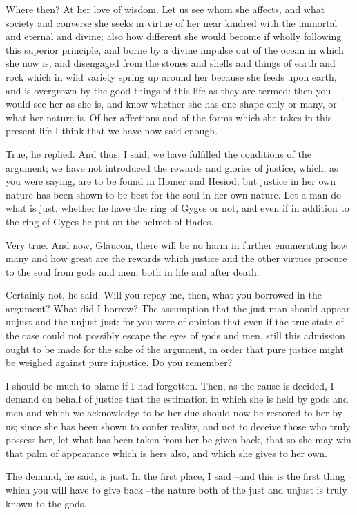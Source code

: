 Where then?
At her love of wisdom. Let us see whom she affects, and what society and converse she seeks in virtue of her near kindred with the immortal and eternal and divine; also how different she would become if wholly following this superior principle, and borne by a divine impulse out of the ocean in which she now is, and disengaged from the stones and shells and things of earth and rock which in wild variety spring up around her because she feeds upon earth, and is overgrown by the good things of this life as they are termed: then you would see her as she is, and know whether she has one shape only or many, or what her nature is. Of her affections and of the forms which she takes in this present life I think that we have now said enough.

True, he replied.
And thus, I said, we have fulfilled the conditions of the argument; we have not introduced the rewards and glories of justice, which, as you were saying, are to be found in Homer and Hesiod; but justice in her own nature has been shown to be best for the soul in her own nature. Let a man do what is just, whether he have the ring of Gyges or not, and even if in addition to the ring of Gyges he put on the helmet of Hades.

Very true.
And now, Glaucon, there will be no harm in further enumerating how many and how great are the rewards which justice and the other virtues procure to the soul from gods and men, both in life and after death.

Certainly not, he said.
Will you repay me, then, what you borrowed in the argument?
What did I borrow?
The assumption that the just man should appear unjust and the unjust just: for you were of opinion that even if the true state of the case could not possibly escape the eyes of gods and men, still this admission ought to be made for the sake of the argument, in order that pure justice might be weighed against pure injustice. Do you remember?

I should be much to blame if I had forgotten.
Then, as the cause is decided, I demand on behalf of justice that the estimation in which she is held by gods and men and which we acknowledge to be her due should now be restored to her by us; since she has been shown to confer reality, and not to deceive those who truly possess her, let what has been taken from her be given back, that so she may win that palm of appearance which is hers also, and which she gives to her own.

The demand, he said, is just.
In the first place, I said --and this is the first thing which you will have to give back --the nature both of the just and unjust is truly known to the gods.

